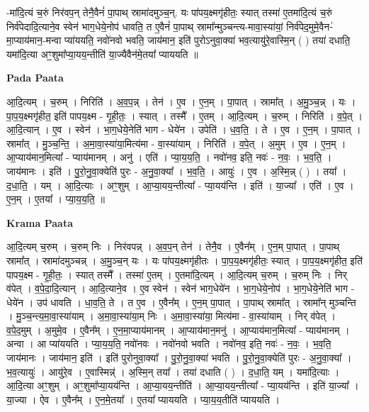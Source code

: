 \documentclass[17pt]{extarticle}
\begin{document}
-मा॑दि॒त्यं च॒रुं निर॑वप॒न् तेनै॒वैनं॑ पा॒पाथ् स्रामा॑दमुञ्च॒न्. यः पा॑पय॒क्ष्मगृ॑हीतः॒ स्यात् तस्मा॑ ए॒तमा॑दि॒त्यं च॒रुं निर्व॑पेदादि॒त्याने॒व स्वेन॑ भाग॒धेये॒नोप॑ धावति॒ त ए॒वैनं॑ पा॒पाथ् स्रामा᳚न्मुञ्चन्त्य-मावा॒स्या॑यां॒ निर्व॑पेद॒मुमे॒वैन-॑मा॒प्याय॑मान॒-मन्वा प्या॑ययति॒ नवो॑नवो भवति॒ जाय॑मान॒ इति॑ पुरोऽनुवा॒क्या॑ भव॒त्यायु॑रे॒वास्मि॒न् ( ) तया॑ दधाति॒ यमा॑दि॒त्या अꣳ॒॒शुमा᳚प्या॒यय॒न्तीति॑ या॒ज्यैवैन॑मे॒तया᳚ प्याययति ॥ \newline

\textbf{Pada Paata} \newline

आ॒दि॒त्यम् । च॒रुम् । निरिति॑ । अ॒व॒प॒न्न् । तेन॑ । ए॒व । ए॒न॒म् । पा॒पात् । स्रामा᳚त् । अ॒मु॒ञ्च॒न्न् । यः । पा॒प॒य॒क्ष्मगृ॑हीत॒ इति॑ पापय॒क्ष्म - गृ॒ही॒तः॒ । स्यात् । तस्मै᳚ । ए॒तम् । आ॒दि॒त्यम् । च॒रुम् । निरिति॑ । व॒पे॒त् । आ॒दि॒त्यान् । ए॒व । स्वेन॑ । भा॒ग॒धेये॒नेति॑ भाग - धेये॑न । उपेति॑ । ध॒व॒ति॒ । ते । ए॒व । ए॒न॒म् । पा॒पात् । स्रामा᳚त् । मु॒ञ्च॒न्ति॒ । अ॒मा॒वा॒स्या॑या॒मित्य॑मा - वा॒स्या॑याम् । निरिति॑ । व॒पे॒त् । अ॒मुम् । ए॒व । ए॒न॒म् । आ॒प्याय॑मान॒मित्या᳚ - प्याय॑मानम् । अनु॑ । एति॑ । प्या॒य॒य॒ति॒ । नवो॑नव॒ इति॒ नवः॑ - न॒वः॒ । भ॒व॒ति॒ । जाय॑मानः । इति॑ । पु॒रो॒नु॒वा॒क्येति॑ पुरः - अ॒नु॒वा॒क्या᳚ । भ॒व॒ति॒ । आयुः॑ । ए॒व । अ॒स्मि॒न्न् ( ) । तया᳚ । द॒धा॒ति॒ । यम् । आ॒दि॒त्याः । अꣳ॒॒शुम् । आ॒प्या॒यय॒न्तीत्या᳚ - प्या॒यय॑न्ति । इति॑ । या॒ज्या᳚ । एति॑ । ए॒व । ए॒न॒म् ।  ए॒तया᳚ । प्या॒य॒य॒ति॒ ॥  \newline


\textbf{Krama Paata} \newline

आ॒दि॒त्यम् च॒रुम् । च॒रुम् निः । निर॑वपन्न् । अ॒व॒प॒न् तेन॑ । तेनै॒व । ए॒वैन᳚म् । ए॒न॒म् पा॒पात् । पा॒पाथ् स्रामा᳚त् । स्रामा॑दमुञ्चन्न् । अ॒मु॒ञ्च॒न् यः । यः पा॑पय॒क्ष्मगृ॑हीतः । पा॒प॒य॒क्ष्मगृ॑हीतः॒ स्यात् । पा॒प॒य॒क्ष्मगृ॑हीत॒ इति॑ पापय॒क्ष्म - गृ॒ही॒तः॒ । स्यात् तस्मै᳚ । तस्मा॑ ए॒तम् । ए॒तमा॑दि॒त्यम् । आ॒दि॒त्यम् च॒रुम् । च॒रुम् निः । निर् व॑पेत् । व॒पे॒दा॒दि॒त्यान् । आ॒दि॒त्याने॒व । ए॒व स्वेन॑ । स्वेन॑ भाग॒धेये॑न । भा॒ग॒धेये॒नोप॑ । भा॒ग॒धेये॒नेति॑ भाग - धेये॑न । उप॑ धावति । धा॒व॒ति॒ ते । त ए॒व । ए॒वैन᳚म् । ए॒न॒म् पा॒पात् । पा॒पाथ् स्रामा᳚त् । स्रामा᳚न् मुञ्चन्ति । मु॒ञ्च॒न्त्य॒मा॒वा॒स्या॑याम् । अ॒मा॒वा॒स्या॑या॒म् निः । अ॒मा॒वा॒स्या॑या॒ मित्य॑मा - वा॒स्या॑याम् । निर् व॑पेत् । व॒पे॒द॒मुम् । अ॒मुमे॒व । ए॒वैन᳚म् । ए॒न॒मा॒प्याय॑मानम् । आ॒प्याय॑मान॒मनु॑ । आ॒प्याय॑मान॒मित्या᳚ - प्याय॑मानम् । अन्वा । आ प्या॑ययति । प्या॒य॒य॒ति॒ नवो॑नवः । नवो॑नवो भवति । नवो॑नव॒ इति॒ नवः॑ - न॒वः॒ । भ॒व॒ति॒ जाय॑मानः । जाय॑मान॒ इति॑ । इति॑ पुरोनुवा॒क्या᳚ । पु॒रो॒नु॒वा॒क्या॑ भवति । पु॒रो॒नु॒वा॒क्येति॑ पुरः - अ॒नु॒वा॒क्या᳚ । भ॒व॒त्यायुः॑ । आयु॑रे॒व । ए॒वास्मिन्न्॑ । अ॒स्मि॒न् तया᳚ । तया॑ दधाति ( ) । द॒धा॒ति॒ यम् । यमा॑दि॒त्याः । आ॒दि॒त्या अꣳ॒॒शुम् । अꣳ॒॒शुमा᳚प्या॒यय॑न्ति । आ॒प्या॒यय॒न्तीति॑ । आ॒प्या॒यय॒न्तीत्या᳚ - प्या॒यय॑न्ति । इति॑ या॒ज्या᳚ । या॒ज्या । ऐव । ए॒वैन᳚म् । ए॒न॒मे॒तया᳚ । ए॒तया᳚ प्याययति । प्या॒य॒य॒तीति॑ प्याययति । \newline
\end{document}
